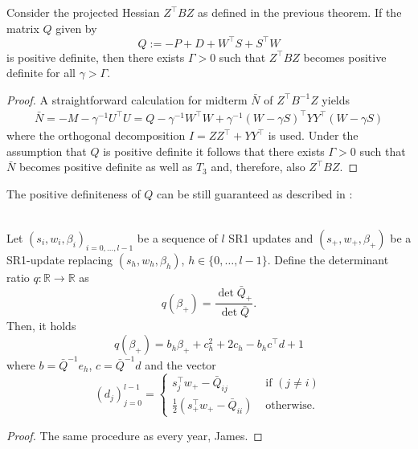 \documentclass{svmult}
\begin{document}
\begin{corollary}
\label{tb:LEHMANN}
	Consider the projected Hessian $Z^{\top}BZ$ as defined in the previous theorem. If the matrix $Q$ given by
\begin{equation*}
	Q:= -P+D+ W^{\top}S + S^{\top}W
\end{equation*}
 is positive definite, then there exists $\Gamma >0$ such that $Z^{\top}BZ$ becomes positive definite for all $\gamma >\Gamma$.
\end{corollary}

\begin{proof}
A straightforward calculation for midterm $\bar{N}$ of $Z^{\top}B^{-1}Z$ yields
\begin{align*}
	\bar{N}=-M-\gamma^{-1}U^\top U = Q - \gamma^{-1} W^\top W + \gamma^{-1}(W -\gamma S )^{\top}YY^{\top}(W -\gamma S )
\end{align*}
where the orthogonal decomposition $I=ZZ^{\top}+YY^{\top}$ is used.
Under the assumption that $Q$ is positive definite it follows that there exists $\Gamma >0$ such that $\bar{N}$ becomes positive definite as well as $T_3$ and, therefore, also $Z^{\top}BZ$.
\end{proof}


\noindent The positive definiteness of $Q$ can be still guaranteed as described in \cite{tb:VOLKER}:
\clearpage
\begin{lemma}\\
	Let $(s_i,w_i,\beta_i)_{i=0,\dots,l-1}$ be a sequence of $l$ SR1 updates and $(s_+,w_+,\beta_+)$ be
	a SR1-update replacing $(s_h, w_h,\beta_h)$, $h \in \{0, \ldots,l-1 \}$. Define the determinant ratio $q:\mathbb{R}\rightarrow \mathbb{R}$ as
	\begin{equation*}
		 q(\beta_+)=\frac{\det \bar{Q}_+}{\det \bar{Q}}.
	\end{equation*}
	Then, it holds
	\begin{equation*}
		q(\beta_+)=b_h\beta_++c_h^2 +2c_h -b_hc^{\top}d +1
	\end{equation*}
	where $b=\bar{Q}^{-1}e_h$, $c=\bar{Q}^{-1}d$ and the vector 
 	\begin{equation*}
		(d_j)_{j=0}^{l-1}=\left\{ \begin{array}{cc}
			s_j^{\top}w_+-\bar{Q}_{ij} & \mbox{ if } (j\neq i)\\
			\frac{1}{2}(s_+^{\top}w_+-\bar{Q}_{ii}) & \mbox{ otherwise.}
		\end{array}\right.
	\end{equation*}
\end{lemma}
\begin{proof}
 	The same procedure as every year, James.
\end{proof}
\end{document}
